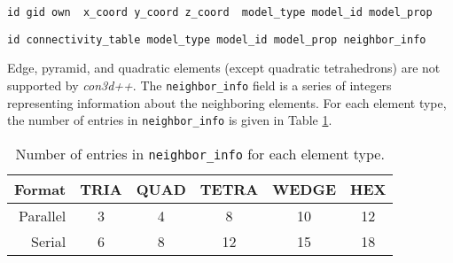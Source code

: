 \documentclass[]{article}
\def\con{\emph{con3d++}}
\def\gap{\vspace*{5mm}}
\begin{document}
\gap
{}
\begin{center}
  \begin{minipage}{0.9\textwidth}
    \begin{lstlisting}
id gid own  x_coord y_coord z_coord  model_type model_id model_prop
    \end{lstlisting}
  \end{minipage}
\end{center}

\gap
{}
\begin{center}
  \begin{minipage}{0.9\textwidth}
    \begin{lstlisting}
id connectivity_table model_type model_id model_prop neighbor_info
    \end{lstlisting}
  \end{minipage}
\end{center}
Edge, pyramid, and quadratic elements (except quadratic tetrahedrons)
are not supported by \con{}. The \verb=neighbor_info= field is a
series of integers representing information about the neighboring
elements. For each element type, the number of entries in
\verb=neighbor_info= is given in Table \ref{tab:n_info}.
\begin{table}[htb]
  \centering
  \cprotect\caption{Number of entries in \verb=neighbor_info= for each element type.}
\label{tab:n_info}
\begin{tabular}{rccccc}
\toprule
Format&TRIA&QUAD&TETRA&WEDGE&HEX\\
\midrule
Parallel&3&4&8&10&12\\
Serial&6&8&12&15&18\\
\bottomrule
\end{tabular}
\end{table}
\end{document}

